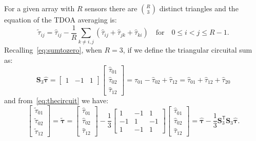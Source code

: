 \noindent
For a given array with \(R\) sensors there are \(\binom{R}{3}\) distinct triangles and the equation of the TDOA averaging is:
\begin{equation}
\tilde{\tau}_{i j}=\hat{\tau}_{i j}-\frac{1}{R} \sum_{k \neq i, j}\left(\hat{\tau}_{i j}+\hat{\tau}_{j k}+\hat{\tau}_{k i}\right) 
\quad \text{for}  \quad 
0 \leq i<j \leq R-1 .
\end{equation}
Recalling~\eqref{eq:sumtozero},  when \(R=3\), if we define the triangular circuital sum as:
\begin{equation}
\mathbf{S}_3 \boldsymbol{\hat{\tau}}=\left[\begin{array}{lll}
1 & -1 & 1
\end{array}\right]
\left[\begin{array}{l}
\hat{\tau}_{01} \\
\hat{\tau}_{02} \\
\hat{\tau}_{12}
\end{array}\right]
=\hat{\tau}_{01}-\hat{\tau}_{02}+\hat{\tau}_{12}
=\hat{\tau}_{01}+\hat{\tau}_{12}+\hat{\tau}_{20}
\label{eq:thecircuit}
\end{equation}
and from~\eqref{eq:thecircuit} we have:
\begin{equation}
\left[\begin{array}{l}
\tilde{\tau}_{01} \\
\tilde{\tau}_{02} \\
\tilde{\tau}_{12}
\end{array}\right]
=
\tilde{\boldsymbol{\tau}}=
\left[\begin{array}{l}
\hat{\tau}_{01} \\
\hat{\tau}_{02} \\
\hat{\tau}_{12}
\end{array}\right]-\frac{1}{3}\left[\begin{array}{rrr}
1 & -1 & 1 \\
-1 & 1 & -1 \\
1 & -1 & 1
\end{array}\right] \left[\begin{array}{l}
\hat{\tau}_{01} \\
\hat{\tau}_{02} \\
\hat{\tau}_{12}
\end{array}\right]
=\boldsymbol{\hat{\tau}}-\frac{1}{3}\mathbf{S}_3^{\mathsf{T}}\mathbf{S}_3\boldsymbol{\hat{\tau}}.
\end{equation}

